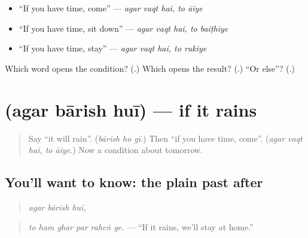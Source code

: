 \begin{itemize}
\raggedright
  \item \textquotedblleft{}If you have time, come\textquotedblright{} — \emph{agar vaqt hai, to āiye}
  \item \textquotedblleft{}If you have time, sit down\textquotedblright{} — \emph{agar vaqt hai, to baiṭhiye}
  \item \textquotedblleft{}If you have time, stay\textquotedblright{} — \emph{agar vaqt hai, to rukiye}
\end{itemize}

\begin{tcolorbox}[breakable,colback=teal!4,colframe=teal!35!black,title={Before you move on}]
Which word opens the condition? (\textbf{}.) Which opens the result? (\textbf{}.) \textquotedblleft{}Or else\textquotedblright{}? (\textbf{}.)
\end{tcolorbox}
\section[\texorpdfstring{\ur{اگر} \ur{بارش} \ur{ہوئی} (agar bārish huī)}{اگر بارش ہوئی (agar bārish huī)}]{   (agar bārish huī) — if it rains}

\label{lesson:UR-C274-agar-barish-hui}



\begin{quote}
Say \textquotedblleft{}it will rain\textquotedblright{}. (\emph{bārish ho gī}.) Then \textquotedblleft{}if you have time, come\textquotedblright{}. (\emph{agar vaqt hai, to āiye}.) Now a condition about tomorrow.
\end{quote}

\subsection*{You'll want to know: the plain past after }
\begin{quote}
\textbf{  }
\end{quote}

\begin{quote}
\emph{agar bārish huī,}
\end{quote}

\begin{quote}
\textbf{     }
\end{quote}

\begin{quote}
\emph{to ham ghar par raheṅ ge.} — \textquotedblleft{}If it rains, we'll stay at home.\textquotedblright{}
\end{quote}

